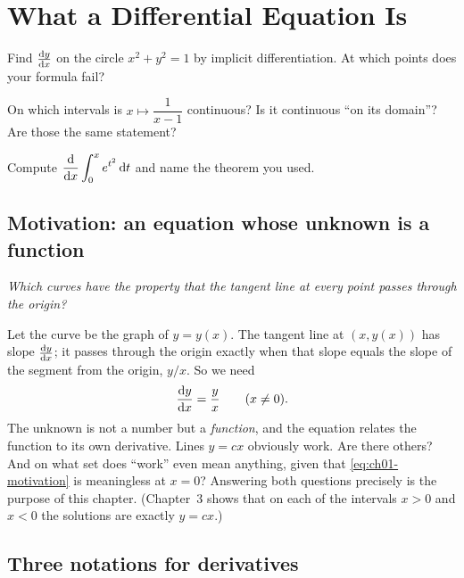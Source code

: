 \chapter{What a Differential Equation Is}\label{ch:ch01}

\begin{diagnostic}
  \item Find $\frac{\mathrm{d}y}{\mathrm{d}x}$ on the circle $x^2 + y^2 = 1$ by implicit
        differentiation. At which points does your formula fail?
  \item On which intervals is $x\mapsto \dfrac{1}{x-1}$ continuous? Is it
        continuous ``on its domain''? Are those the same statement?
  \item Compute $\displaystyle\frac{\mathrm{d}}{\mathrm{d}x}\int_0^x e^{t^2}\,\mathrm{d}t$ and name
        the theorem you used.
\end{diagnostic}

\section{Motivation: an equation whose unknown is a function}\label{sec:ch01-motivation}

\emph{Which curves have the property that the tangent line at every point
passes through the origin?}

Let the curve be the graph of $y = y(x)$. The tangent line at $(x, y(x))$ has
slope $\frac{\mathrm{d}y}{\mathrm{d}x}$; it passes through the origin exactly when that slope
equals the slope of the segment from the origin, $y/x$. So we need
\begin{equation}\label{eq:ch01-motivation}
  \frac{\mathrm{d}y}{\mathrm{d}x} = \frac{y}{x}\qquad (x\neq 0).
\end{equation}
The unknown is not a number but a \emph{function}, and the equation relates
the function to its own derivative. Lines $y = cx$ obviously work. Are there
others? And on what set does ``work'' even mean anything, given that
\eqref{eq:ch01-motivation} is meaningless at $x = 0$? Answering both questions
precisely is the purpose of this chapter. (Chapter~3 shows that on each of the intervals $x>0$ and $x<0$ the
solutions are exactly $y=cx$.)

\section{Three notations for derivatives}\label{sec:ch01-notation}


